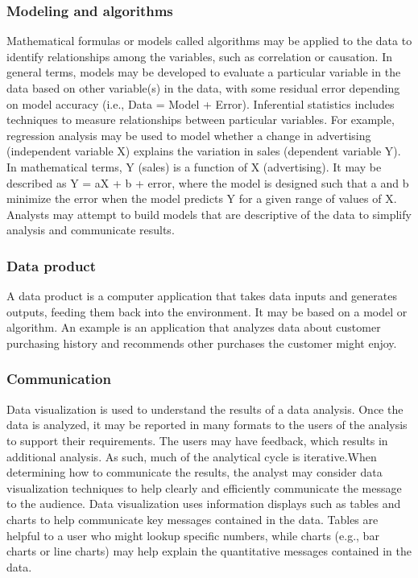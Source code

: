 \documentclass[a4paper,12pt,oneside]{report}
\begin{document}
{\subsubsection{Modeling and algorithms}
{Mathematical formulas or models called algorithms may be applied to the data to identify relationships among the variables, such as correlation or causation. In general terms, models may be developed to evaluate a particular variable in the data based on other variable(s) in the data, with some residual error depending on model accuracy (i.e., Data = Model + Error).
Inferential statistics includes techniques to measure relationships between particular variables. For example, regression analysis may be used to model whether a change in advertising (independent variable X) explains the variation in sales (dependent variable Y). In mathematical terms, Y (sales) is a function of X (advertising). It may be described as Y = aX + b + error, where the model is designed such that a and b minimize the error when the model predicts Y for a given range of values of X. Analysts may attempt to build models that are descriptive of the data to simplify analysis and communicate results.}
\subsubsection{Data product}
{A data product is a computer application that takes data inputs and generates outputs, feeding them back into the environment. It may be based on a model or algorithm. An example is an application that analyzes data about customer purchasing history and recommends other purchases the customer might enjoy.}
\subsubsection{Communication}
{Data visualization is used to understand the results of a data analysis. Once the data is analyzed, it may be reported in many formats to the users of the analysis to support their requirements. The users may have feedback, which results in additional analysis. As such, much of the analytical cycle is iterative.When determining how to communicate the results, the analyst may consider data visualization techniques to help clearly and efficiently communicate the message to the audience. Data visualization uses information displays such as tables and charts to help communicate key messages contained in the data. Tables are helpful to a user who might lookup specific numbers, while charts (e.g., bar charts or line charts) may help explain the quantitative messages contained in the data.}
}
\end{document}
